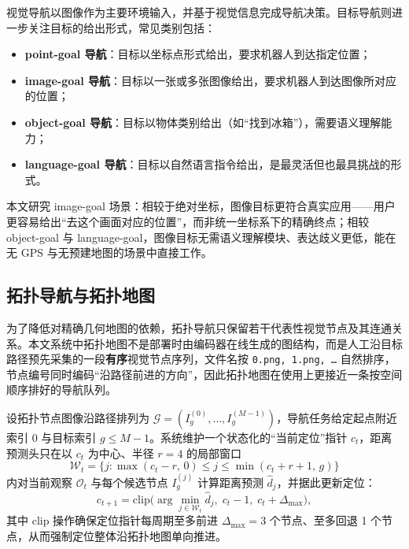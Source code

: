 视觉导航以图像作为主要环境输入，并基于视觉信息完成导航决策\cite{zhu2017targetdriven,anderson2018evaluation}。目标导航则进一步关注目标的给出形式，常见类别包括：
\begin{itemize}
    \item \textbf{point-goal 导航}\cite{ddppo2020}：目标以坐标点形式给出，要求机器人到达指定位置；
    \item \textbf{image-goal 导航}：目标以一张或多张图像给出，要求机器人到达图像所对应的位置；
    \item \textbf{object-goal 导航}：目标以物体类别给出（如``找到冰箱''），需要语义理解能力；
    \item \textbf{language-goal 导航}：目标以自然语言指令给出，是最灵活但也最具挑战的形式。
\end{itemize}
本文研究 image-goal 场景：相较于绝对坐标，图像目标更符合真实应用——用户更容易给出``去这个画面对应的位置''，而非统一坐标系下的精确终点；相较 object-goal 与 language-goal，图像目标无需语义理解模块、表达歧义更低，能在无 GPS 与无预建地图的场景中直接工作。

\subsection{拓扑导航与拓扑地图}

为了降低对精确几何地图的依赖，拓扑导航只保留若干代表性视觉节点及其连通关系\cite{savinov2018sptm,chaplot2020nts,shah2021ving}。本文系统中拓扑地图不是部署时由编码器在线生成的图结构，而是人工沿目标路径预先采集的一段\textbf{有序}视觉节点序列，文件名按 \texttt{0.png, 1.png, \ldots} 自然排序，节点编号同时编码``沿路径前进的方向''，因此拓扑地图在使用上更接近一条按空间顺序排好的导航队列。

设拓扑节点图像沿路径排列为 $\mathcal{G}=(I_g^{(0)}, \ldots, I_g^{(M-1)})$，导航任务给定起点附近索引 $0$ 与目标索引 $g\le M-1$。系统维护一个状态化的``当前定位''指针 $c_t$，距离预测头只在以 $c_t$ 为中心、半径 $r=4$ 的局部窗口
\begin{equation}
\mathcal{W}_t = \{j : \max(c_t-r,\,0) \le j \le \min(c_t+r+1,\,g)\}
\end{equation}
内对当前观察 $\mathcal{O}_t$ 与每个候选节点 $I_g^{(j)}$ 计算距离预测 $\hat d_j$，并据此更新定位：
\begin{equation}
c_{t+1} = \mathrm{clip}\bigl(\arg\min_{j\in\mathcal{W}_t} \hat d_j,\; c_t-1,\; c_t+\Delta_{\max}\bigr),
\end{equation}
其中 clip 操作确保定位指针每周期至多前进 $\Delta_{\max}=3$ 个节点、至多回退 1 个节点，从而强制定位整体沿拓扑地图单向推进。


